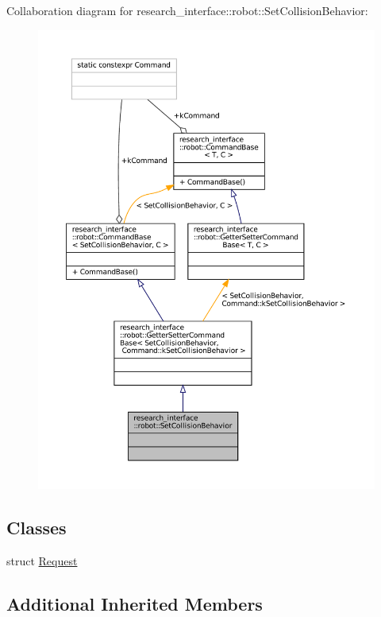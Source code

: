 Collaboration diagram for research\+\_\+interface\+:\+:robot\+:\+:Set\+Collision\+Behavior\+:
\nopagebreak
\begin{figure}[H]
\begin{center}
\leavevmode
\includegraphics[width=350pt]{structresearch__interface_1_1robot_1_1SetCollisionBehavior__coll__graph}
\end{center}
\end{figure}
\subsection*{Classes}
\begin{DoxyCompactItemize}
\item 
struct \hyperlink{structresearch__interface_1_1robot_1_1SetCollisionBehavior_1_1Request}{Request}
\end{DoxyCompactItemize}
\subsection*{Additional Inherited Members}


